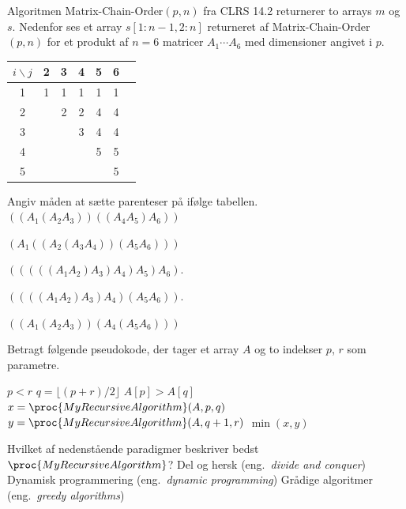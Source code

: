 \sideskift

Algoritmen {\sc Matrix-Chain-Order}$(p,n)$ fra CLRS 14.2 returnerer to arrays $m$ og $s$.
%
Nedenfor ses et array $s[1:n-1, 2:n]$ returneret af {\sc Matrix-Chain-Order}$(p,n)$ for et produkt af $n=6$ matricer $A_1\cdots A_6$ med dimensioner angivet i $p$.
\medskip

\begin{tabular}{c|cccccc}
$i \backslash j$ & 2 & 3 & 4 & 5 & 6 \\
\hline
1 & 1 & 1 & 1 & 1 & 1 \\
2 & & 2 & 2 & 4 & 4 \\
3 &     & & 3 & 4 & 4 \\
4 &     &     & & 5 & 5 \\
5 &     &     &     & & 5 \\
\end{tabular}

\medskip\noindent
Angiv måden at sætte parenteser på ifølge tabellen.
\etsvar
%
\mulighederstart
\svar $((A_1(A_2 A_3))((A_4 A_5)A_6))$

\svar $(A_1((A_2(A_3A_4))(A_5 A_6)))$ \korrekt

\svar $(((((A_1 A_2)A_3)A_4)A_5)A_6)$.

\svar $((((A_1 A_2)A_3)A_4)(A_5A_6))$.

\svar $((A_1(A_2 A_3))(A_4(A_5 A_6)))$
\mulighederslut
{}

Betragt følgende pseudokode, der tager et array $A$ og to indekser $p$, $r$ som parametre.
\begin{codebox}
  \li \If $p<r$ \Do
  \li $q = \lfloor (p+r)/2\rfloor$
  \li \If $A[p]>A[q]$ \Do
  \li {}
  \li \Else
  \li $x = \proc{MyRecursiveAlgorithm}(A, p, q)$
  \li $y = \proc{MyRecursiveAlgorithm}(A, q+1, r)$
  \li \Return $\min(x,y)$ \End
  \li \Else
  \li {}\End
\end{codebox}
Hvilket af nedenstående paradigmer beskriver bedst $\proc{MyRecursiveAlgorithm}$?
\etsvar
\mulighederstart
\svar Del og hersk (eng.~\emph{divide and conquer}) \korrekt
\svar Dynamisk programmering (eng.~\emph{dynamic programming})
\svar Grådige algoritmer (eng.~\emph{greedy algorithms})
\mulighederslut
{}

